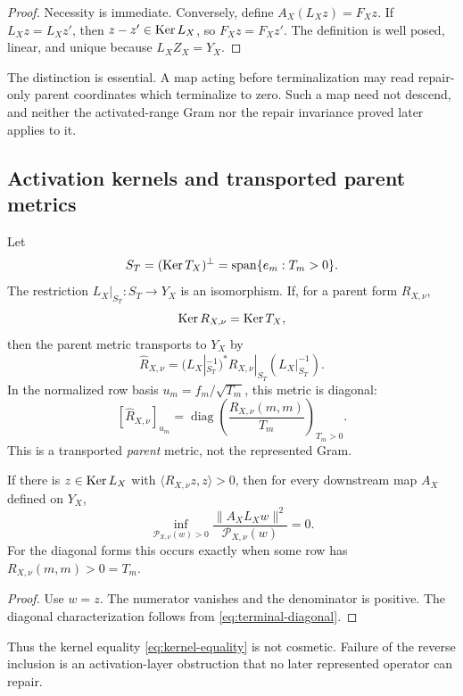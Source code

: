 \begin{proof}
Necessity is immediate. Conversely, define \(A_X(L_Xz)=F_Xz\). If
\(L_Xz=L_Xz'\), then \(z-z'\in\operatorname{Ker} L_X\), so \(F_Xz=F_Xz'\). The definition
is well posed, linear, and unique because \(L_XZ_X=Y_X\).
\end{proof}

The distinction is essential. A map acting before terminalization may read
repair-only parent coordinates which terminalize to zero. Such a map need not
descend, and neither the activated-range Gram nor the repair invariance proved
later applies to it.

\subsection{Activation kernels and transported parent metrics}
Let
\[
 S_T=(\operatorname{Ker} T_X)^\perp
     =\operatorname{span}\{e_m:T_m>0\}.
\]
The restriction \(L_X|_{S_T}:S_T\to Y_X\) is an isomorphism. If, for a parent
form \(R_{X,\nu}\),
\begin{equation}\label{eq:kernel-equality}
 \operatorname{Ker} R_{X,\nu}=\operatorname{Ker} T_X,
\end{equation}
then the parent metric transports to \(Y_X\) by
\[
 \widehat R_{X,\nu}
 =(L_X|_{S_T}^{-1})^*R_{X,\nu}|_{S_T}(L_X|_{S_T}^{-1}).
\]
In the normalized row basis \(u_m=f_m/\sqrt{T_m}\), this metric is diagonal:
\begin{equation}\label{eq:transported-parent}
 [\widehat R_{X,\nu}]_{u_m}
 =\operatorname{diag}\left(
 \frac{R_{X,\nu}(m,m)}{T_m}\right)_{T_m>0}.
\end{equation}
This is a transported \emph{parent} metric, not the represented Gram.

\begin{proposition}\label{prop:activation-kill}
If there is \(z\in\operatorname{Ker} L_X\) with
\(\langle R_{X,\nu}z,z\rangle>0\), then for every downstream map \(A_X\)
defined on \(Y_X\),
\[
 \inf_{\mathcal P_{X,\nu}(w)>0}
 \frac{\|A_XL_Xw\|^2}{\mathcal P_{X,\nu}(w)}=0.
\]
For the diagonal forms this occurs exactly when some row has
\(R_{X,\nu}(m,m)>0=T_m\).
\end{proposition}

\begin{proof}
Use \(w=z\). The numerator vanishes and the denominator is positive. The
diagonal characterization follows from \eqref{eq:terminal-diagonal}.
\end{proof}

Thus the kernel equality \eqref{eq:kernel-equality} is not cosmetic. Failure
of the reverse inclusion is an activation-layer obstruction that no later
represented operator can repair.
